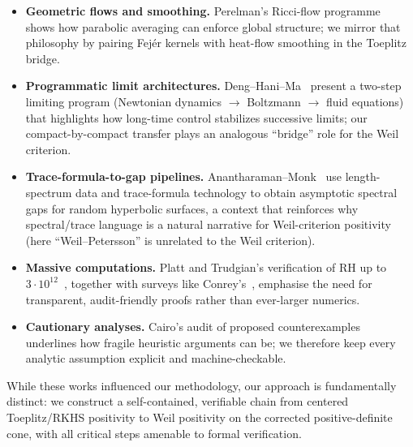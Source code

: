 \begin{itemize}
  \item \textbf{Geometric flows and smoothing.} Perelman's Ricci-flow programme~\cite{Perelman2002,Perelman2003} shows how parabolic averaging can enforce global structure; we mirror that philosophy by pairing Fej\'er kernels with heat-flow smoothing in the Toeplitz bridge.

  \item \textbf{Programmatic limit architectures.} Deng--Hani--Ma~\cite{DengHaniMa2025Hilbert6} present a two-step limiting program (Newtonian dynamics $\to$ Boltzmann $\to$ fluid equations) that highlights how long-time control stabilizes successive limits; our compact-by-compact transfer plays an analogous ``bridge'' role for the Weil criterion.

  \item \textbf{Trace-formula-to-gap pipelines.} Anantharaman--Monk~\cite{AnantharamanMonk2025FR} use length-spectrum data and trace-formula technology to obtain asymptotic spectral gaps for random hyperbolic surfaces, a context that reinforces why spectral/trace language is a natural narrative for Weil-criterion positivity (here ``Weil--Petersson'' is unrelated to the Weil criterion).

  \item \textbf{Massive computations.} Platt and Trudgian's verification of RH up to $3\cdot10^{12}$~\cite{PlattTrudgian2021}, together with surveys like Conrey's~\cite{Conrey2003}, emphasise the need for transparent, audit-friendly proofs rather than ever-larger numerics.

  \item \textbf{Cautionary analyses.} Cairo's audit of proposed counterexamples~\cite{cairo2025counterexample} underlines how fragile heuristic arguments can be; we therefore keep every analytic assumption explicit and machine-checkable.
\end{itemize}

\noindent While these works influenced our methodology, our approach is fundamentally distinct: we construct a self-contained, verifiable chain from centered Toeplitz/RKHS positivity to Weil positivity on the corrected positive-definite cone, with all critical steps amenable to formal verification.
